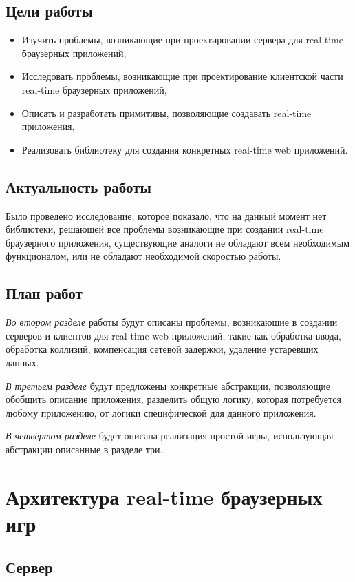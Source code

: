 \documentclass[a4paper,14pt, openany]{book}
\begin{document}
\section{Цели работы}

\begin{itemize}
  \item Изучить проблемы, возникающие при проектировании сервера для real-time браузерных приложений,
  \item Исследовать проблемы, возникающие при проектирование клиентской части real-time браузерных приложений,
  \item Описать и разработать примитивы, позволяющие создавать real-time приложения,
  \item Реализовать библиотеку для создания конкретных real-time web приложений.
\end{itemize}

\section{Актуальность работы}

Было проведено исследование, которое показало, что на данный момент нет библиотеки, решающей все проблемы возникающие при создании real-time браузерного приложения, существующие аналоги не обладают всем необходимым функционалом, или не обладают необходимой скоростью работы.

\section{План работ}
\emph{Во втором разделе} работы будут описаны проблемы, возникающие в создании серверов и клиентов для real-time web приложений, такие как обработка ввода, обработка коллизий, компенсация сетевой задержки, удаление устаревших данных. 

\emph{В третьем разделе} будут предложены конкретные абстракции, позволяющие обобщить описание приложения, разделить общую логику, которая потребуется любому приложению, от логики специфической для данного приложения. 

\emph{В четвёртом разделе} будет описана реализация простой игры, использующая абстракции описанные в разделе три.


\chapter{Архитектура  real-time браузерных игр}

\section{Сервер}
\end{document}
